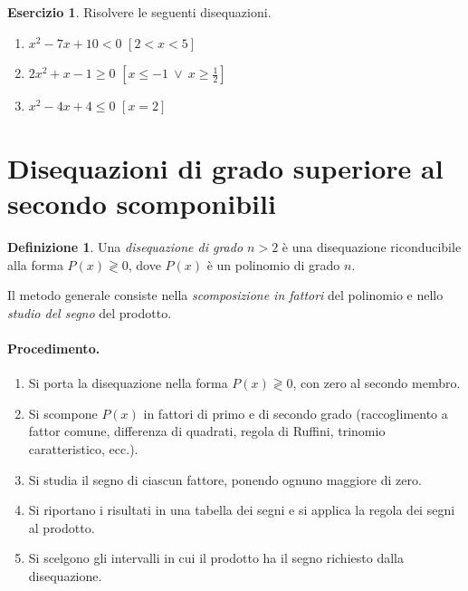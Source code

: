 \documentclass[12pt,a4paper,openany]{book}
\theoremstyle{definition}
\newtheorem{definizione}{Definizione}[section]
\newtheorem{esercizio}{Esercizio}[section]
\theoremstyle{plain}
\theoremstyle{remark}
\begin{document}
\begin{esercizio}
Risolvere le seguenti disequazioni.
\begin{enumerate}[label=\alph*)]
\item $x^2-7x+10<0$ \hfill $[2<x<5]$
\item $2x^2+x-1\ge 0$ \hfill $[x\le -1\ \lor\ x\ge \tfrac12]$
\item $x^2-4x+4\le 0$ \hfill $[x=2]$
\end{enumerate}
\end{esercizio}

\section{Disequazioni di grado superiore al secondo scomponibili}

\begin{definizione}
Una \emph{disequazione di grado $n>2$} è una disequazione riconducibile alla forma $P(x)\gtrless 0$, dove $P(x)$ è un polinomio di grado $n$.
\end{definizione}

Il metodo generale consiste nella \emph{scomposizione in fattori} del polinomio e nello \emph{studio del segno} del prodotto.

\paragraph{Procedimento.}
\begin{enumerate}[label=\arabic*)]
\item Si porta la disequazione nella forma $P(x)\gtrless 0$, con zero al secondo membro.
\item Si scompone $P(x)$ in fattori di primo e di secondo grado (raccoglimento a fattor comune, differenza di quadrati, regola di Ruffini, trinomio caratteristico, ecc.).
\item Si studia il segno di ciascun fattore, ponendo ognuno maggiore di zero.
\item Si riportano i risultati in una tabella dei segni e si applica la regola dei segni al prodotto.
\item Si scelgono gli intervalli in cui il prodotto ha il segno richiesto dalla disequazione.
\end{enumerate}
\end{document}
